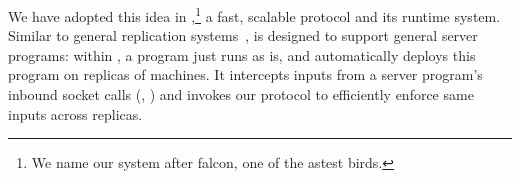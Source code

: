 %
%
%

We have adopted this idea in \xxx,\footnote{We name our system after
falcon, one of the astest birds.} a fast, scalable \paxos protocol and its
runtime system. Similar to general replication
systems~\cite{eve:osdi12,rex:eurosys14,crane:sosp15}, \xxx is designed to
support general server programs: within \xxx, a program just runs
as is, and \xxx automatically deploys this program on replicas of machines. It
intercepts inputs from a server program's inbound socket calls (\eg, \recv) and
invokes our \paxos protocol to efficiently enforce same inputs across
replicas.

